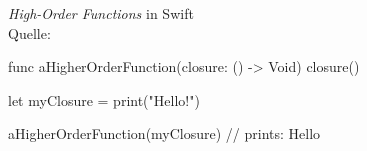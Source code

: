 \begin{listing}[H]
\caption{\textit{High-Order Functions} in Swift \\ Quelle:\cite[]{Swift.HighOrderFunctions}}
\label{lst:SwiftHighOrderFunctions}
\begin{SwiftCode}
func aHigherOrderFunction(closure: () -> Void) {
    closure()
}

let myClosure = {
    print("Hello!")
}

aHigherOrderFunction(myClosure) // prints: Hello
\end{SwiftCode}
\end{listing}






